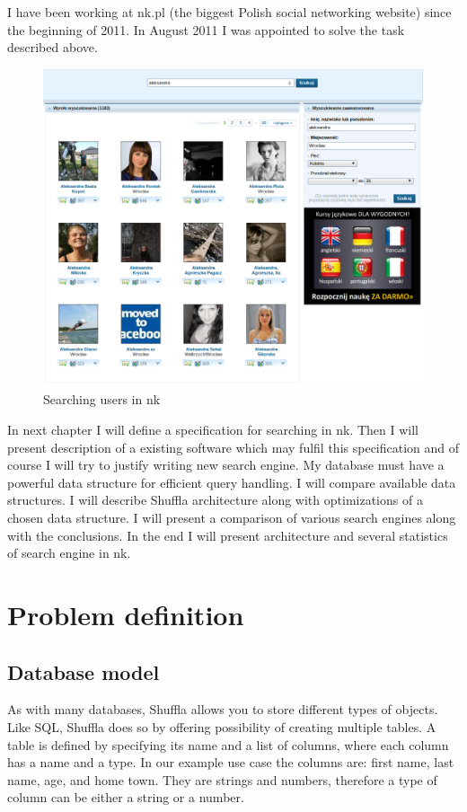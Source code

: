\documentclass[10pt,a4paper]{article}
\begin{document}
I have been working at nk.pl (the biggest Polish social networking website) since the beginning of 2011. In August 2011 I was appointed to solve the task described above. 

\begin{figure}[h!]
\centering
  \includegraphics[width=12cm]{nk_search}
  \caption{Searching users in nk}
  \label{fig:nk_search}
\end{figure}

In next chapter I will define a specification for searching in nk. Then I will present description of a existing software which may fulfil this specification and of course I will try to justify writing new search engine. My database must have a powerful data structure for efficient query handling. I will compare available data structures. I will describe Shuffla architecture along with optimizations of a chosen data structure. I will present a comparison of various search engines along with the conclusions. In the end I will present architecture and several statistics of search engine in nk.

\section{Problem definition}

\subsection{Database model}

As with many databases, Shuffla allows you to store different types of objects. Like SQL, Shuffla does so by offering possibility of creating multiple tables. A table is defined by specifying its name and a list of columns, where each column has a name and a type. In our example use case the columns are: first name, last name, age, and home town. They are strings and numbers, therefore a type of column can be either a string or a number.
\end{document}

